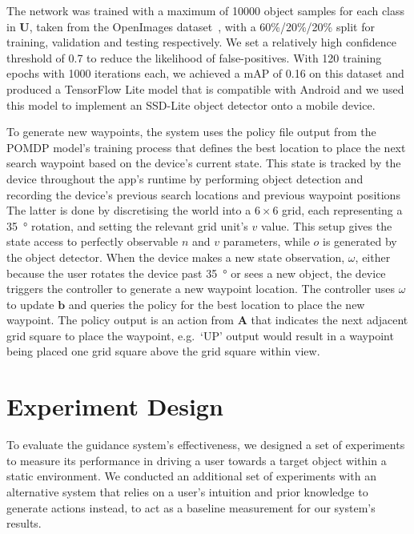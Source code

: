 \documentclass[runningheads]{llncs}
\begin{document}
The network was trained with a maximum of 10000 object samples for each class in $\mathbf{U}$, taken from the OpenImages dataset~\cite{openimages}, with a 60\%/20\%/20\% split for training, validation and testing respectively.
We set a relatively high confidence threshold of 0.7 to reduce the likelihood of false-positives.
With 120 training epochs with 1000 iterations each, we achieved a mAP of 0.16 on this dataset and produced a TensorFlow Lite model that is compatible with Android and we used this model to implement an SSD-Lite object detector onto a mobile device.

To generate new waypoints, the system uses the policy file output from the POMDP model's training process that defines the best location to place the next search waypoint based on the device's current state.
This state is tracked by the device throughout the app's runtime by performing object detection and recording the device's previous search locations and previous waypoint positions
The latter is done by discretising the world into a $6\times6$ grid, each representing a \SI{35}{\degree} rotation, and setting the relevant grid unit's $v$ value.
This setup gives the state access to perfectly observable $n$ and $v$ parameters, while $o$ is generated by the object detector. 
When the device makes a new state observation, $\omega$, either because the user rotates the device past \SI{35}{\degree} or sees a new object, the device triggers the controller to generate a new waypoint location.
The controller uses $\omega$ to update $\mathbf{b}$ and queries the policy for the best location to place the new waypoint. 
The policy output is an action from $\mathbf{A}$ that indicates the next adjacent grid square to place the waypoint, e.g.\ `UP' output would result in a waypoint being placed one grid square above the grid square within view. 

\section{Experiment Design}\label{sec:experiments}

To evaluate the guidance system's effectiveness, we designed a set of experiments to measure its performance in driving a user towards a target object within a static environment. 
We conducted an additional set of experiments with an alternative system that relies on a user's intuition and prior knowledge to generate actions instead, to act as a baseline measurement for our system's results. 
\end{document}
